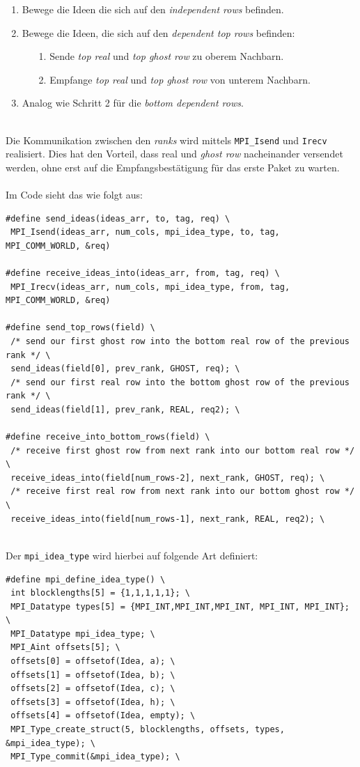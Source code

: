 \begin{enumerate}
	\item Bewege die Ideen die sich auf den \textit{independent rows} befinden.
 	\item Bewege die Ideen, die sich auf den \textit{dependent top rows} befinden:
\begin{enumerate}
	\item[1.] Sende \textit{top real} und \textit{top ghost row} zu oberem Nachbarn.
	\item[2.] Empfange \textit{top real} und \textit{top ghost row} von unterem Nachbarn.
\end{enumerate}
	\item Analog wie Schritt 2 für die \textit{bottom dependent rows}.
\end{enumerate}
\quad \\
Die Kommunikation zwischen den \textit{ranks} wird mittels \texttt{MPI\_Isend} und \texttt{Irecv} realisiert. Dies hat den Vorteil, dass real und \textit{ghost row} nacheinander versendet werden, ohne erst auf die Empfangsbestätigung für das erste Paket zu warten. \\
\newpage
\quad \\
Im Code sieht das wie folgt aus: \\
\begin{verbatim}
#define send_ideas(ideas_arr, to, tag, req) \
 MPI_Isend(ideas_arr, num_cols, mpi_idea_type, to, tag, MPI_COMM_WORLD, &req)

#define receive_ideas_into(ideas_arr, from, tag, req) \
 MPI_Irecv(ideas_arr, num_cols, mpi_idea_type, from, tag, MPI_COMM_WORLD, &req)

#define send_top_rows(field) \
 /* send our first ghost row into the bottom real row of the previous rank */ \
 send_ideas(field[0], prev_rank, GHOST, req); \
 /* send our first real row into the bottom ghost row of the previous rank */ \
 send_ideas(field[1], prev_rank, REAL, req2); \

#define receive_into_bottom_rows(field) \
 /* receive first ghost row from next rank into our bottom real row */ \
 receive_ideas_into(field[num_rows-2], next_rank, GHOST, req); \
 /* receive first real row from next rank into our bottom ghost row */ \
 receive_ideas_into(field[num_rows-1], next_rank, REAL, req2); \
\end{verbatim}
\quad \\
Der \texttt{mpi\_idea\_type} wird hierbei auf folgende Art definiert: \\
\begin{verbatim}
#define mpi_define_idea_type() \
 int blocklengths[5] = {1,1,1,1,1}; \
 MPI_Datatype types[5] = {MPI_INT,MPI_INT,MPI_INT, MPI_INT, MPI_INT}; \
 MPI_Datatype mpi_idea_type; \
 MPI_Aint offsets[5]; \
 offsets[0] = offsetof(Idea, a); \
 offsets[1] = offsetof(Idea, b); \
 offsets[2] = offsetof(Idea, c); \
 offsets[3] = offsetof(Idea, h); \
 offsets[4] = offsetof(Idea, empty); \
 MPI_Type_create_struct(5, blocklengths, offsets, types, &mpi_idea_type); \
 MPI_Type_commit(&mpi_idea_type); \
\end{verbatim}
